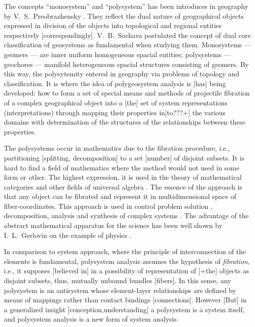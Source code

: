 \documentclass[12pt,leqno]{book}
\begin{document}
The concepts ``monosystem'' and ``polysystem'' has been introduces in geography by V.~S.~Preobrazhensky \cite{b338}. They reflect the dual nature of geographical objects expressed in division of the objects into topological and regional entities respectively [correspondingly]. V.~B.~Sochava \cite{b398, b399} postulated the concept of dual core classification of geosystems as fundamental when studying them. Monosystems --- geomers --- are inner uniform homogeneous spacial entities; polysystems --- geochores --- manifold heterogeneous spacial structures consisting of geomers. By this way, the polysytemity entered in geography via problems of topology and classification. It is where the idea of polygeosystem analysis is [has] being developed: how to form a set of special means and methods of projectile fibration of a complex geographical object into a [the] set of system representations (interpretations) through mapping their properties in[to???+] the various domains with determination of the structures of the relationships between these properties.

The polysystems occur in mathematics due to the fibration procedure, i.e., partitioning [splitting, decomposition] to a set [number] of disjoint subsets. It is hard to find a field of mathematics where the method would not used in some form or other. The highest expression, it is used in the theory of mathematical categories and other fields of universal algebra \cite{b57, b123, b325, b335}. The essence of the approach is that any object can be fibrated and represent it in multidimensional space of fiber-coordinates. This approach is used in control problem solution \cite{b11, b12, b252}, decomposition, analysis and synthesis of complex systems \cite{b391}. The advantage of the abstract mathematical apparatus for the science has been well shown by I.~L.~Gerlovin on the example of physics \cite{b104}.

In comparison to system approach, where the principle of interconnection of the elements is fundamental, polysystem analysis assumes the hypothesis of \emph{fibration}, i.e., it supposes [believed in] in a possibility of representation of [+the] objects as disjoint subsets, thus, mutually unbound bundles [fibers]. In this sense, any polysystem is an antisystem whose element-layer relationships are defined by means of mappings rather than contact bindings [connections]. However [But] in a generalized insight [conception,understanding] a polysystem is a system itself, and polysystem analysis is a new form of system analysis.
\end{document}
